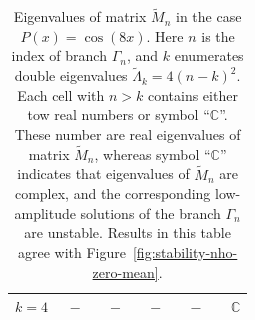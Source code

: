 \begin{table}[tbp]
\begin{tabular}{cccccc}
	$k = 4$ & \, $-$ \, & \, $-$ \, & \, $-$ \, & \, $-$ \, & \, $\mathbb{C}$ \\ \hline
\end{tabular}
\caption{
	Eigenvalues of matrix $\widetilde{M}_n$ in the case $P(x) = \cos (8x)$.
	Here $n$ is the index of branch $\Gamma_n$, and $k$ enumerates double eigenvalues $\widetilde{\Lambda}_k = 4(n - k)^2$.
	Each cell with $n > k$ contains either tow real numbers or symbol ``$\mathbb{C}$''.
	These number are real eigenvalues of matrix $\widetilde{M}_n$, whereas symbol ``$\mathbb{C}$'' indicates that eigenvalues of $\widetilde{M}_n$ are complex, and the corresponding low-amplitude solutions of the branch $\Gamma_n$ are unstable.
	Results in this table agree with Figure~\ref{fig:stability-nho-zero-mean}.
}
\label{tab:M-eigenvalues-8}
\end{table}

